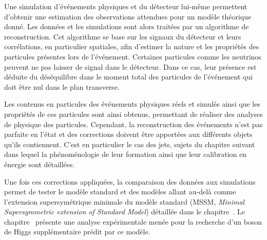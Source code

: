 \par Une simulation d'événements physiques et du détecteur lui-même permettent d'obtenir une estimation des observations attendues pour un modèle théorique donné.
Les données et les simulations sont alors traitées par un algorithme de reconstruction.
Cet algorithme se base sur les signaux du détecteur et leurs corrélations, en particulier spatiales, afin d'estimer la nature et les propriétés des particules présentes lors de l'événement.
Certaines particules comme les neutrinos peuvent ne pas laisser de signal dans le détecteur.
Dans ce cas, leur présence est déduite du déséquilibre dans le moment total des particules de l'événement qui doit être nul dans le plan transverse.
\par Les contenus en particules des événements physiques réels et simulés ainsi que les propriétés de ces particules sont ainsi obtenus, permettant de réaliser des analyses de physique des particules.
Cependant, la reconstruction des événements n'est pas parfaite en l'état et des corrections doivent être apportées aux différents objets qu'ils contiennent.
C'est en particulier le cas des jets, sujets du chapitre suivant dans lequel la phénoménologie de leur formation ainsi que leur calibration en énergie sont détaillées.
\par Une fois ces corrections appliquées, la comparaison des données aux simulations permet de tester le modèle standard et des modèles allant au-delà comme l'extension supersymétrique minimale du modèle standard (MSSM, \emph{Minimal Supersymmetric extension of Standard Model}) détaillée dans le chapitre~.
Le chapitre~ présente une analyse expérimentale menée pour la recherche d'un boson de Higgs supplémentaire prédit par ce modèle.
